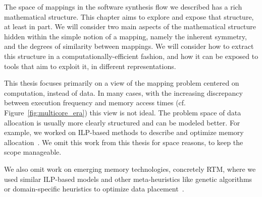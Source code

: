 The space of mappings in the software synthesis flow we described has a rich mathematical structure.
This chapter aims to explore and expose that structure, at least in part.
We will consider two main aspects of the mathematical structure hidden within the simple notion of a mapping, namely the inherent symmetry, and the degrees of similarity between mappings.
We will consider how to extract this structure in a computationally-efficient fashion, and how it can be exposed to tools that aim to exploit it, in different representations.

This thesis focuses primarily on a view of the mapping problem centered on computation, instead of data.
In many cases, with the increasing discrepancy between execution frequency and memory access times (cf. Figure~\ref{fig:multicore_era}) this view is not ideal.
The problem space of data allocation is usually more clearly structured and can be modeled better. 
For example, we worked on \ac{ILP}-based methods to describe and optimize memory allocation~\cite{odendahl_date14,odendahl15,goens_jsa16}.
We omit this work from this thesis for space reasons, to keep the scope manageable.

We also omit work on emerging memory technologies, concretely \ac{RTM}, where we used similar \ac{ILP}-based models and other meta-heuristics like genetic algorithms or domain-specific heuristics to optimize data placement~\cite{khan_date20}.
